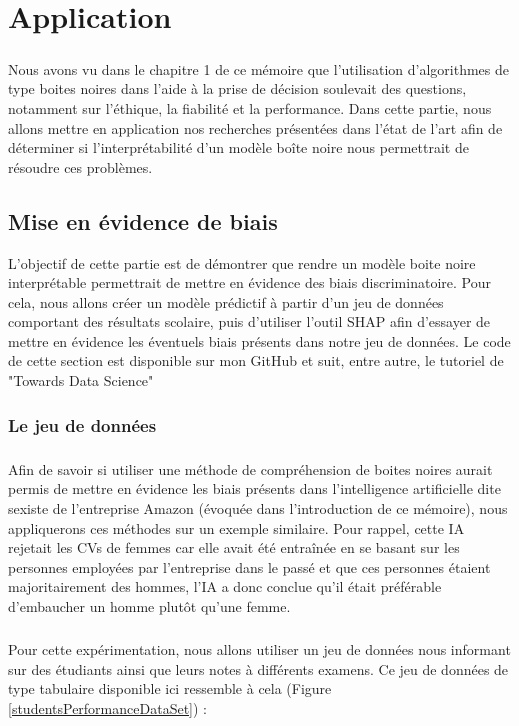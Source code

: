 \chapter{Application}
\paragraph{}Nous avons vu dans le chapitre 1 de ce mémoire que l'utilisation d'algorithmes de type boites noires dans l'aide à la prise de décision soulevait des questions, notamment sur l'éthique, la fiabilité et la performance. Dans cette partie, nous allons mettre en application nos recherches présentées dans l'état de l'art afin de déterminer si l'interprétabilité d'un modèle boîte noire nous permettrait de résoudre ces problèmes.

\section{Mise en évidence de biais}
L'objectif de cette partie est de démontrer que rendre un modèle boite noire interprétable permettrait de mettre en évidence des biais discriminatoire. Pour cela, nous allons créer un modèle prédictif à partir d'un jeu de données comportant des résultats scolaire, puis d'utiliser l'outil SHAP afin d'essayer de mettre en évidence les éventuels biais présents dans notre jeu de données. Le code de cette section est disponible sur mon GitHub \cite{shapMyDepot} et suit, entre autre, le tutoriel de "Towards Data Science"\cite{shapTuto}

\subsection{Le jeu de données}
\paragraph{}Afin de savoir si utiliser une méthode de compréhension de boites noires aurait permis de mettre en évidence les biais présents dans l'intelligence artificielle dite sexiste de l'entreprise Amazon (évoquée dans l'introduction de ce mémoire), nous appliquerons ces méthodes sur un exemple similaire. Pour rappel, cette IA rejetait les CVs de femmes car elle avait été entraînée en se basant sur les personnes employées par l'entreprise dans le passé et que ces personnes étaient majoritairement des hommes, l'IA a donc conclue qu'il était préférable d'embaucher un homme plutôt qu'une femme.

\paragraph{}Pour cette expérimentation, nous allons utiliser un jeu de données nous informant sur des étudiants ainsi que leurs notes à différents examens. Ce jeu de données de type tabulaire disponible ici \cite{examScore} ressemble à cela (Figure \ref{studentsPerformanceDataSet}) :

